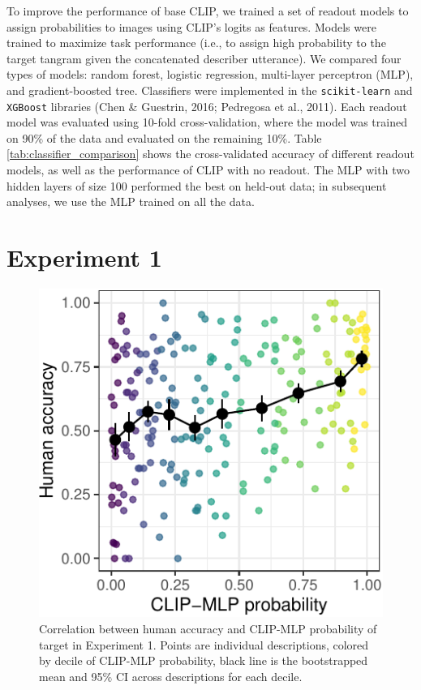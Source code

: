 \documentclass[10pt, letterpaper]{article}
\begin{document}
To improve the performance of base CLIP, we trained a set of readout
models to assign probabilities to images using CLIP's logits as
features. Models were trained to maximize task performance (i.e., to
assign high probability to the target tangram given the concatenated
describer utterance). We compared four types of models: random forest,
logistic regression, multi-layer perceptron (MLP), and gradient-boosted
tree. Classifiers were implemented in the \texttt{scikit-learn} and
\texttt{XGBoost} libraries (Chen \& Guestrin, 2016; Pedregosa et al.,
2011). Each readout model was evaluated using 10-fold cross-validation,
where the model was trained on 90\% of the data and evaluated on the
remaining 10\%. Table \ref{tab:classifier_comparison} shows the
cross-validated accuracy of different readout models, as well as the
performance of CLIP with no readout. The MLP with two hidden layers of
size 100 performed the best on held-out data; in subsequent analyses, we
use the MLP trained on all the data.

\section{Experiment 1}\label{experiment-1}

\begin{CodeChunk}
\begin{figure}[t]

{\centering \includegraphics[width=0.7\linewidth]{figs/fig-calibration-1} 

}

\caption[Correlation between human accuracy and CLIP-MLP probability of target in Experiment 1]{Correlation between human accuracy and CLIP-MLP probability of target in Experiment 1.  Points are individual descriptions, colored by decile of CLIP-MLP probability, black line is the bootstrapped mean and 95\% CI across descriptions for each decile. \label{calibration}}\label{fig:fig-calibration}
\end{figure}
\end{CodeChunk}
\end{document}
